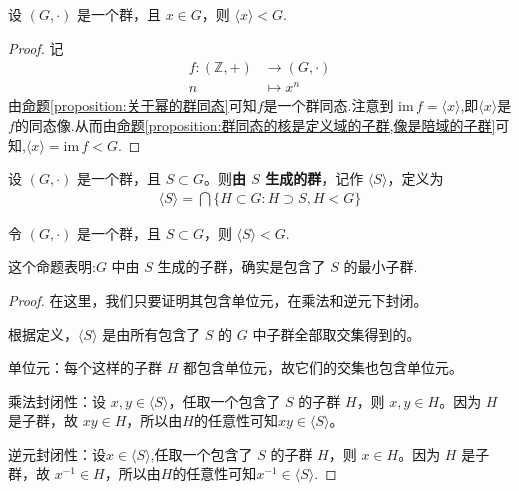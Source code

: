 \documentclass[../../main.tex]{subfiles}
\begin{document}
\begin{proposition}\label{proposition:<x>是一个子群}
设 $(G,\cdot)$ 是一个群，且 $x\in G$，则 $\langle x\rangle<G$.
\end{proposition}
\begin{proof}
记
\begin{align*}
f:(\mathbb{Z} ,+)&\rightarrow (G,\cdot )
\\
n&\mapsto x^n
\end{align*}
由\hyperref[proposition:关于幂的群同态]{命题\ref{proposition:关于幂的群同态}}可知$f$是一个群同态.注意到 $\mathrm{im}\,f=\langle x\rangle$,即$\langle x \rangle$是$f$的同态像.从而由\hyperref[proposition:群同态的核是定义域的子群,像是陪域的子群]{命题\ref{proposition:群同态的核是定义域的子群,像是陪域的子群}}可知,$\langle x\rangle=\mathrm{im}\,f<G$.
\end{proof}

\begin{definition}[由 $S$ 生成的群]
设 $(G,\cdot)$ 是一个群，且 $S\subset G$。则\textbf{由 $S$ 生成的群}，记作 $\langle S\rangle$，定义为
\begin{align*}
\langle S\rangle=\bigcap\{H\subset G:H\supset S, H < G\}
\end{align*}
\end{definition}

\begin{proposition}
令 $(G,\cdot)$ 是一个群，且 $S\subset G$，则 $\langle S\rangle < G$.
\end{proposition}
\begin{note}
这个命题表明:$G$ 中由 $S$ 生成的子群，确实是包含了 $S$ 的最小子群.
\end{note}
\begin{proof}
在这里，我们只要证明其包含单位元，在乘法和逆元下封闭。

根据定义，$\langle S\rangle$ 是由所有包含了 $S$ 的 $G$ 中子群全部取交集得到的。

单位元：每个这样的子群 $H$ 都包含单位元，故它们的交集也包含单位元。

乘法封闭性：设 $x,y\in\langle S\rangle$，任取一个包含了 $S$ 的子群 $H$，则 $x,y\in H$。因为 $H$ 是子群，故 $xy\in H$，所以由$H$的任意性可知$xy\in\langle S\rangle$。

逆元封闭性：设$x\in \langle S\rangle$,任取一个包含了 $S$ 的子群 $H$，则 $x\in H$。因为 $H$ 是子群，故 $x^{-1}\in H$，所以由$H$的任意性可知$x^{-1}\in\langle S\rangle$.
\end{proof}
\end{document}

